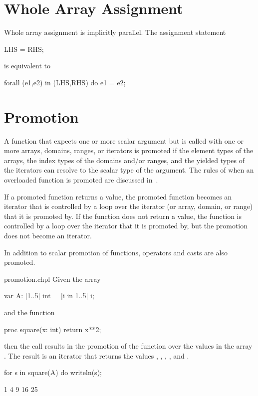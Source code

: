 \section{Whole Array Assignment}

Whole array assignment is implicitly parallel.  The assignment
statement
\begin{chapel}
LHS = RHS;
\end{chapel}
is equivalent to
\begin{chapel}
forall (e1,e2) in (LHS,RHS) do
  e1 = e2;
\end{chapel}

\section{Promotion}
\label{Promotion}

A function that expects one or more scalar argument but is called with
one or more arrays, domains, ranges, or iterators is promoted if the
element types of the arrays, the index types of the domains and/or
ranges, and the yielded types of the iterators can resolve to the
scalar type of the argument.  The rules of when an overloaded function
is promoted are discussed in~.

If a promoted function returns a value, the promoted function becomes
an iterator that is controlled by a loop over the iterator (or array,
domain, or range) that it is promoted by.  If the function does not
return a value, the function is controlled by a loop over the iterator
that it is promoted by, but the promotion does not become an iterator.

In addition to scalar promotion of functions, operators and casts are
also promoted.

\begin{chapelexample}{promotion.chpl}
Given the array
\begin{chapel}
var A: [1..5] int = [i in 1..5] i;
\end{chapel}
and the function
\begin{chapel}
proc square(x: int) return x**2;
\end{chapel}
then the call  results in the promotion of
the  function over the values in the array .  The
result is an iterator that returns the
values , , , , and .
\begin{chapelnoprint}
for s in square(A) do writeln(s);
\end{chapelnoprint}
\begin{chapeloutput}
1
4
9
16
25
\end{chapeloutput}
\end{chapelexample}


